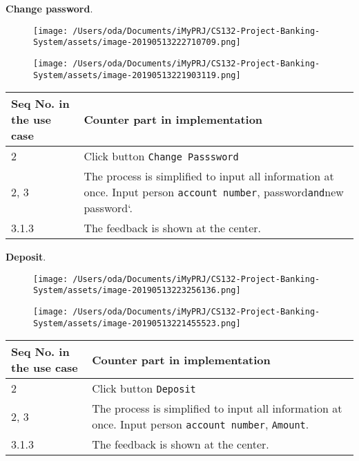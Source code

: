 \documentclass[]{article}
\begin{document}
\textbf{Change password}.

\begin{figure}
\centering
\texttt{[image: /Users/oda/Documents/iMyPRJ/CS132-Project-Banking-System/assets/image-20190513222710709.png]}
\caption{}
\end{figure}

\begin{figure}
\centering
\texttt{[image: /Users/oda/Documents/iMyPRJ/CS132-Project-Banking-System/assets/image-20190513221903119.png]}
\caption{}
\end{figure}

\begin{longtable}[]{@{}ll@{}}
\toprule
Seq No. in the use case & Counter part in implementation\tabularnewline
\midrule
\endhead
2 & Click button \texttt{Change\ Passsword}\tabularnewline
2, 3 & The process is simplified to input all information at once. Input
person \texttt{account\ number}, password\texttt{and}new
password`.\tabularnewline
3.1.3 & The feedback is shown at the center.\tabularnewline
\bottomrule
\end{longtable}

\textbf{Deposit}.

\begin{figure}
\centering
\texttt{[image: /Users/oda/Documents/iMyPRJ/CS132-Project-Banking-System/assets/image-20190513223256136.png]}
\caption{}
\end{figure}

\begin{figure}
\centering
\texttt{[image: /Users/oda/Documents/iMyPRJ/CS132-Project-Banking-System/assets/image-20190513221455523.png]}
\caption{}
\end{figure}

\begin{longtable}[]{@{}ll@{}}
\toprule
Seq No. in the use case & Counter part in implementation\tabularnewline
\midrule
\endhead
2 & Click button \texttt{Deposit}\tabularnewline
2, 3 & The process is simplified to input all information at once. Input
person \texttt{account\ number}, \texttt{Amount}.\tabularnewline
3.1.3 & The feedback is shown at the center.\tabularnewline
\bottomrule
\end{longtable}
\end{document}
